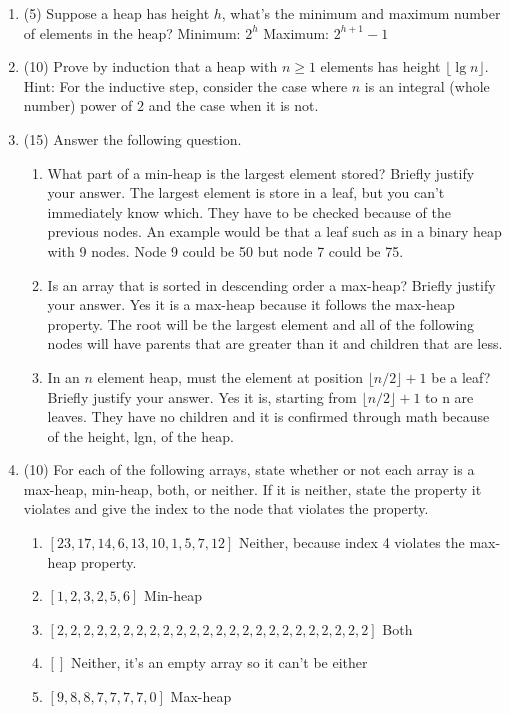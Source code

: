 \documentclass[12pt]{article}
\begin{document}
\begin{enumerate}
\item (5) Suppose a heap has height $h$, what's the minimum and maximum number of elements in the heap? \newline
Minimum: $2^h$
\newline
Maximum: $2^{h+1} - 1$

\item (10) Prove by induction that a heap with $n \geq 1$ elements has height
$\lfloor \lg n \rfloor$. Hint: For the inductive step, consider the case where $n$ is an 
integral (whole number) power of $2$ and the case when it is not.

\item (15) Answer the following question.
\begin{enumerate}
\item What part of a min-heap is the largest element stored? Briefly justify your answer. The largest element is store in a leaf, but you can't immediately know which. They have to be checked because of the previous nodes. An example would be that a leaf such as in a binary heap with 9 nodes. Node 9 could be 50 but node 7 could be 75.
\item Is an array that is sorted in descending order a max-heap? Briefly justify your answer. Yes it is a max-heap because it follows the max-heap property. The root will be the largest element and all of the following nodes will have parents that are greater than it and children that are less. 
\item In an $n$ element heap, must the element at position $\lfloor n/2 \rfloor + 1$ be a leaf?
 Briefly justify your answer. Yes it is, starting from $\lfloor n/2 \rfloor + 1$ to n are leaves. They have no children and it is confirmed through math because of the height, lgn, of the heap.
\end{enumerate}

\item (10) For each of the following arrays, state whether or not each array is a max-heap, min-heap, both, or neither. If it is neither, state the property it violates and give the index to the node that violates the property.
\begin{enumerate}
\item $[23,17,14,6,13,10,1,5,7,12]$ Neither, because index 4 violates the max-heap property.
\item $[1,2,3,2,5,6]$ Min-heap
\item $[2,2,2,2,2,2,2,2,2,2,2,2,2,2,2,2,2,2,2,2,2,2,2,2]$ Both
\item $[]$ Neither, it's an empty array so it can't be either
\item $[9,8,8,7,7,7,7,0]$ Max-heap
\end{enumerate}


\end{enumerate}
\end{document}
